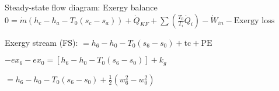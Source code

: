 Steady-state flow diagram: Exergy balance  
\( 0 = \dot{m} \left( h_c - h_a - T_0 \left( s_c - s_a \right) \right) + \dot{Q}_{KF} + \sum \left( \frac{T_0}{T_i} \dot{Q}_i \right) - \dot{W}_{in} - \text{Exergy loss} \)  

Exergy stream (FS):  
\( = h_6 - h_0 - T_0 \left( s_6 - s_0 \right) + \text{tc} + \text{PE} \)  

\( - ex_6 - ex_0 = \left[ h_6 - h_0 - T_0 \left( s_6 - s_0 \right) \right] + k_g \)  

\( = h_6 - h_0 - T_0 \left( s_6 - s_0 \right) + \frac{1}{2} \left( w_6^2 - w_0^2 \right) \)